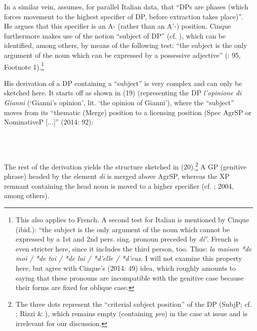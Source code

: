 \documentclass[output=paper]{langsci/langscibook}
\begin{document}
  In a similar vein, \citet[23]{Cinque2014} assumes, for parallel Italian data, that “DPs are phases (which forces movement to the highest specifier of DP, before extraction takes place)”. He argues that this specifier is an A- (rather than an A’-) position. Cinque furthermore makes use of the notion “subject of DP” (cf. \citealt{Cinque1980}), which can be identified, among others, by means of the following test: “the subject is the only argument of the noun which can be expressed by a possessive adjective” (\citealt{Cinque2014}: 95, Footnote 1).\footnote{This also applies to French. A second test for Italian is mentioned by Cinque (ibid.): “the subject is the only argument of the noun which cannot be expressed by a 1st and 2nd pers. sing. pronoun preceded by \textit{di}”. French is even stricter here, since it includes the third person, too. Thus: \textit{la maison *de moi / *de toi / *de lui / *d’elle / *d’eux}. I will not examine this property here, but agree with Cinque’s (2014: 49) idea, which roughly amounts to saying that these pronouns are incompatible with the genitive case because their forms are fixed for oblique case.}

His derivation of a DP containing a “subject” is very complex and can only be sketched here. It starts off as shown in (19) (representing the DP \textit{l’opinione di Gianni} (‘Gianni’s opinion’, lit. ‘the opinion of Gianni’), where the “subject” moves from its “thematic (Merge) position to a licensing position (Spec AgrSP or NominativeP [...]” (2014: 92):

     
 

\begin{styleFramecontents}
\ea%
    \label{ex:key:19}
    \gll\\
        \\
    \glt
    \z

        
\end{styleFramecontents}

The rest of the derivation yields the structure sketched in (20).\footnote{The three dots represent the “criterial subject position” of the DP (SubjP; cf. \citealt{Rizzi2007}; Rizzi \& \citealt{Shlonsky2007}), which remains empty (containing \textit{pro}) in the case at issue and is irrelevant for our discussion.} A GP (genitive phrase) headed by the element \textit{di} is merged above AgrSP, whereas the XP remnant containing the head noun is moved to a higher specifier (cf. \citealt{Kayne1999}; 2004, among others).
\end{document}
